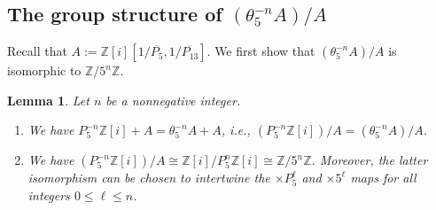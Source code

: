 \documentclass[11pt]{amsart}
\newtheorem{lemma}{Lemma}[section]
\theoremstyle{definition}
\newcommand{\Z}{{\mathbb Z}}
\begin{document}

\subsection{The group structure of $(\theta_5^{-n}A)/A$}

Recall that $A:=\mathbb{Z}[i][1/\overline{P_5}, 1/\overline{P_{13}}]$.  We first show that $(\theta_5^{-n}A)/A$ is isomorphic to $\mathbb{Z}/5^n\mathbb{Z}$.

\begin{lemma}\label{lem:equivalence}
Let $n$ be a nonnegative integer.
\begin{enumerate}
    \item We have $P_5^{-n}\Z[i]+A=\theta_5^{-n}A+A$, i.e., $(P_5^{-n}\mathbb{Z}[i])/A = (\theta_5^{-n}A)/A$.
    \item We have $(P_5^{-n}\mathbb{Z}[i])/A \cong \mathbb{Z}[i]/P_5^{n}\mathbb{Z}[i] \cong \mathbb{Z}/5^n\mathbb{Z}$.  Moreover, the latter isomorphism can be chosen to intertwine the $\times P_5^\ell$ and $\times 5^\ell$ maps for all integers $0 \leq \ell \leq n$.
\end{enumerate}
\end{lemma}
\end{document}
